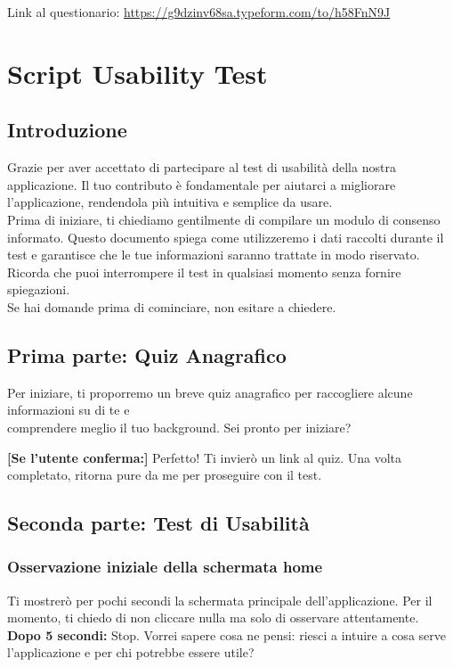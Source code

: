 \documentclass{article}
\begin{document}
\noindent Link al questionario: \url{https://g9dzinv68sa.typeform.com/to/h58FnN9J}

\section{Script Usability Test}
\subsection{Introduzione}
Grazie per aver accettato di partecipare al test di usabilità della nostra applicazione. Il tuo contributo è fondamentale per aiutarci a migliorare l'applicazione, rendendola più intuitiva e semplice da usare.\\
Prima di iniziare, ti chiediamo gentilmente di compilare un modulo di consenso informato. Questo documento spiega come utilizzeremo i dati raccolti durante il test e garantisce che le tue informazioni saranno trattate in modo riservato. Ricorda che puoi interrompere il test in qualsiasi momento senza fornire spiegazioni.\\
Se hai domande prima di cominciare, non esitare a chiedere.

\subsection{Prima parte: Quiz Anagrafico}
Per iniziare, ti proporremo un breve quiz anagrafico per raccogliere alcune informazioni su di te e\\ comprendere meglio il tuo background. Sei pronto per iniziare?

\textbf{[Se l'utente conferma:]} Perfetto! Ti invierò un link al quiz. Una volta completato, ritorna pure da me per proseguire con il test.

\subsection{Seconda parte: Test di Usabilità}
\subsubsection{Osservazione iniziale della schermata home}
Ti mostrerò per pochi secondi la schermata principale dell’applicazione. Per il momento, ti chiedo di non cliccare nulla ma solo di osservare attentamente.\\

\textbf{Dopo 5 secondi:} 
Stop. Vorrei sapere cosa ne pensi: riesci a intuire a cosa serve l’applicazione e per chi potrebbe essere utile?\\
\end{document}

